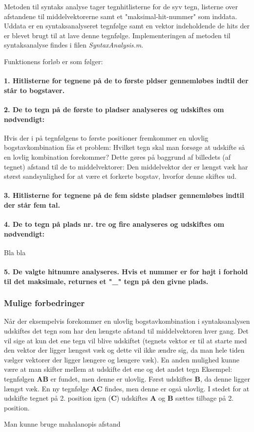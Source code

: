 Metoden til syntaks analyse tager tegnhitlisterne for de syv tegn, listerne over afstandene til middelvektorerne samt et "maksimal-hit-nummer" som inddata. Uddata er en syntaksanalyseret tegnfølge samt en vektor indeholdende de hits der er blevet brugt til at lave denne tegnfølge. Implementeringen af metoden til syntaksanalyse findes i filen \textit{SyntaxAnalysis.m}.

Funktionens forløb er som følger:

\paragraph{1. Hitlisterne for tegnene på de to første pldser gennemløbes indtil der står to bogstaver.}
\paragraph{2. De to tegn på de første to pladser analyseres og udskiftes om nødvendigt:}
Hvis der i på tegnfølgens to første positioner fremkommer en ulovlig bogstavkombination fås et problem: Hvilket tegn skal man forsøge at udskifte så en lovlig kombination forekommer? Dette gøres på baggrund af billedets (af tegnet) afstand til de to middelvektorer: Den middelvektor der er længst væk har størst sandsynlighed for at være et forkerte bogstav, hvorfor denne skiftes ud.

\paragraph{3. Hitlisterne for tegnene på de fem sidste pladser gennemløbes indtil der står fem tal.}
\paragraph{4. De to tegn på plads nr. tre og fire analyseres og udskiftes om nødvendigt:}

Bla bla

\paragraph{5. De valgte hitnumre analyseres. Hvis et nummer er for højt i forhold til det maksimale, returnes et "\_" tegn på den givne plads.}

\subsubsection{Mulige forbedringer}
Når der eksempelvis forekommer en ulovlig bogstavkombination i syntaksanalysen udskiftes det tegn som har den længste afstand til middelvektoren hver gang. Det vil sige at kun det ene tegn vil blive udskiftet (tegnets vektor er til at starte med den vektor der ligger længest væk og dette vil ikke ændre sig, da man hele tiden vælger vektorer der ligger længere og længere væk). En anden mulighed kunne være at man skifter mellem at udskifte det ene og det andet tegn Eksempel: tegnfølgen \textbf{AB} er fundet, men denne er ulovlig. Først udskiftes \textbf{B}, da denne ligger længst væk. En ny tegnfølge \textbf{AC} findes, men denne er også ulovlig. I stedet for at udskifte tegnet på 2. position igen (\textbf{C}) udskiftes \textbf{A} og \textbf{B} sættes tilbage på 2. position.

Man kunne bruge mahalanopis afstand